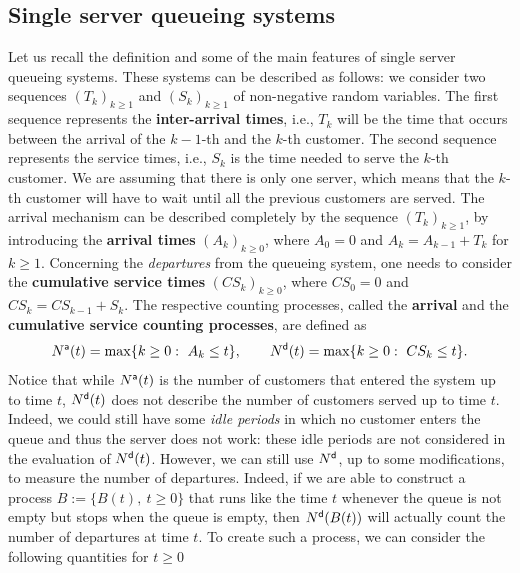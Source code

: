 \documentclass[]{amsart}
\numberwithin{equation}{section}
\theoremstyle{remark}
\theoremstyle{definition}
\begin{document}
\subsection{Single server queueing systems}\label{subs:ssqs}
Let us recall the definition and some of the main features of single server queueing systems. These systems can be described as follows: we consider two sequences $(T_k)_{k \ge 1}$ and $(S_k)_{k \ge 1}$ of non-negative random variables. The first sequence represents the \textbf{inter-arrival times}, i.e., $T_k$ will be the time that occurs between the arrival of the $k-1$-th and the $k$-th customer. The second sequence represents the service times, i.e., $S_k$ is the time needed to serve the $k$-th customer. We are assuming that there is only one server, which means that the $k$-th customer will have to wait until all the previous customers are served. The arrival mechanism can be described completely by the sequence $(T_k)_{k \ge 1}$, by introducing the \textbf{arrival times} $(A_k)_{k \ge 0}$, where $A_0=0$ and $A_k=A_{k-1}+T_k$ for $k \ge 1$. Concerning the \textit{departures} from the queueing system, one needs to consider the \textbf{cumulative service times} $(CS_k)_{k \ge 0}$, where $CS_0=0$ and $CS_k=CS_{k-1}+S_k$. The respective counting processes, called the \textbf{arrival} and the \textbf{cumulative service counting processes}, are defined as
\begin{equation*}
	N^{\sf a}(t)=\max\{k \ge 0: \ A_k \le t\}, \qquad N^{\sf d}(t)=\max\{k \ge 0: \ CS_k \le t\}.
\end{equation*}
Notice that while $N^{\sf a}(t)$ is the number of customers that entered the system up to time $t$, $N^{\sf d}(t)$ does not describe the number of customers served up to time $t$. Indeed, we could still have some \textit{idle periods} in which no customer enters the queue and thus the server does not work: these idle periods are not considered in the evaluation of $N^{\sf d}(t)$. However, we can still use $N^{\sf d}$, up to some modifications, to measure the number of departures. Indeed, if we are able to construct a process $B:=\{B(t), \ t \ge 0\}$ that runs like the time $t$ whenever the queue is not empty but stops when the queue is empty, then $N^{\sf d}(B(t))$ will actually count the number of departures at time $t$. To create such a process, we can consider the following quantities for $t \ge 0$
\end{document}
